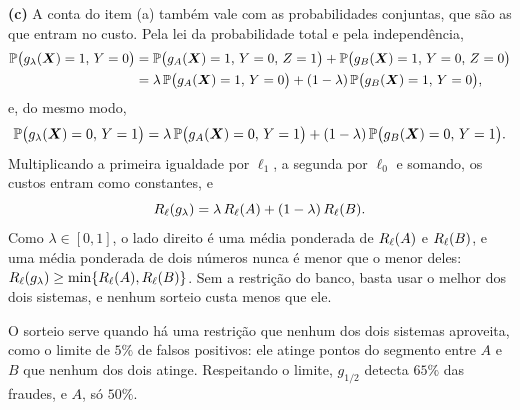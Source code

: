 \begin{solucao}
\smallskip
\textbf{(c)} A conta do item (a) também vale com as probabilidades conjuntas, que são as que
entram no custo. Pela lei da probabilidade total e pela independência,
\begin{align*}
  \mathbb{P}\big(g_\lambda(\bm{X})=1,\,Y=0\big)
  &=\mathbb{P}\big(g_A(\bm{X})=1,\,Y=0,\,Z=1\big)+\mathbb{P}\big(g_B(\bm{X})=1,\,Y=0,\,Z=0\big)\\
  &=\lambda\,\mathbb{P}\big(g_A(\bm{X})=1,\,Y=0\big)+(1-\lambda)\,\mathbb{P}\big(g_B(\bm{X})=1,\,Y=0\big),
\end{align*}
e, do mesmo modo,
\[
  \mathbb{P}\big(g_\lambda(\bm{X})=0,\,Y=1\big)
  =\lambda\,\mathbb{P}\big(g_A(\bm{X})=0,\,Y=1\big)+(1-\lambda)\,\mathbb{P}\big(g_B(\bm{X})=0,\,Y=1\big).
\]
Multiplicando a primeira igualdade por $\ell_1$, a segunda por $\ell_0$ e somando, os custos
entram como constantes, e
\[
  R_\ell(g_\lambda)=\lambda\,R_\ell(A)+(1-\lambda)\,R_\ell(B).
\]
Como $\lambda\in[0,1]$, o lado direito é uma média ponderada de $R_\ell(A)$ e
$R_\ell(B)$, e uma média ponderada de dois números nunca é menor que o menor deles:
$R_\ell(g_\lambda)\ge\min\{R_\ell(A),R_\ell(B)\}$. Sem a restrição do banco,
basta usar o melhor dos dois sistemas, e nenhum sorteio custa menos que ele.

O sorteio serve quando há uma restrição que nenhum dos dois sistemas aproveita, como o limite de
$5\%$ de falsos positivos: ele atinge pontos do segmento entre $A$ e $B$ que nenhum dos dois
atinge. Respeitando o limite, $g_{1/2}$ detecta $65\%$ das fraudes, e $A$, só $50\%$.
\end{solucao}

